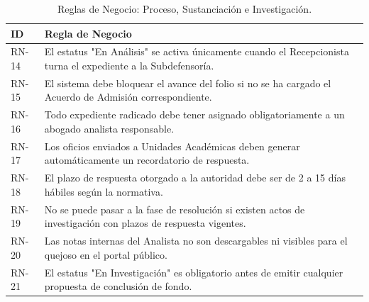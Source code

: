 \begin{table}[h!]
\centering
\scriptsize
\caption{Reglas de Negocio: Proceso, Sustanciación e Investigación.}
\label{tab:rn_proceso}
\begin{tabular}{@{} l p{12cm} @{}}
\toprule
\rowcolor[HTML]{2D3E50} 
\textbf{\color[HTML]{FFFFFF} ID} & \textbf{\color[HTML]{FFFFFF} Regla de Negocio} \\ \midrule
RN-14 & El estatus "En Análisis" se activa únicamente cuando el Recepcionista turna el expediente a la Subdefensoría. \\
\rowcolor[HTML]{F2F4F7} 
RN-15 & El sistema debe bloquear el avance del folio si no se ha cargado el Acuerdo de Admisión correspondiente. \\
RN-16 & Todo expediente radicado debe tener asignado obligatoriamente a un abogado analista responsable. \\
\rowcolor[HTML]{F2F4F7} 
RN-17 & Los oficios enviados a Unidades Académicas deben generar automáticamente un recordatorio de respuesta. \\
RN-18 & El plazo de respuesta otorgado a la autoridad debe ser de 2 a 15 días hábiles según la normativa. \\
\rowcolor[HTML]{F2F4F7} 
RN-19 & No se puede pasar a la fase de resolución si existen actos de investigación con plazos de respuesta vigentes. \\
RN-20 & Las notas internas del Analista no son descargables ni visibles para el quejoso en el portal público. \\
\rowcolor[HTML]{F2F4F7} 
RN-21 & El estatus "En Investigación" es obligatorio antes de emitir cualquier propuesta de conclusión de fondo. \\ \bottomrule
\end{tabular}
\end{table}

